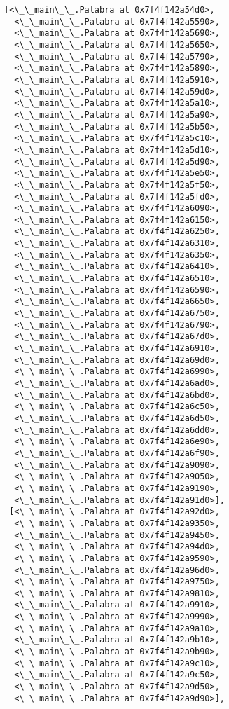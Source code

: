 \documentclass[12pt,a4paper,table]{article}
\begin{document}
\begin{tcolorbox}[breakable, size=fbox, boxrule=.5pt, pad at break*=1mm, opacityfill=0]
\begin{Verbatim}[commandchars=\\\{\}]
 [<\_\_main\_\_.Palabra at 0x7f4f142a54d0>,
  <\_\_main\_\_.Palabra at 0x7f4f142a5590>,
  <\_\_main\_\_.Palabra at 0x7f4f142a5690>,
  <\_\_main\_\_.Palabra at 0x7f4f142a5650>,
  <\_\_main\_\_.Palabra at 0x7f4f142a5790>,
  <\_\_main\_\_.Palabra at 0x7f4f142a5890>,
  <\_\_main\_\_.Palabra at 0x7f4f142a5910>,
  <\_\_main\_\_.Palabra at 0x7f4f142a59d0>,
  <\_\_main\_\_.Palabra at 0x7f4f142a5a10>,
  <\_\_main\_\_.Palabra at 0x7f4f142a5a90>,
  <\_\_main\_\_.Palabra at 0x7f4f142a5b50>,
  <\_\_main\_\_.Palabra at 0x7f4f142a5c10>,
  <\_\_main\_\_.Palabra at 0x7f4f142a5d10>,
  <\_\_main\_\_.Palabra at 0x7f4f142a5d90>,
  <\_\_main\_\_.Palabra at 0x7f4f142a5e50>,
  <\_\_main\_\_.Palabra at 0x7f4f142a5f50>,
  <\_\_main\_\_.Palabra at 0x7f4f142a5fd0>,
  <\_\_main\_\_.Palabra at 0x7f4f142a6090>,
  <\_\_main\_\_.Palabra at 0x7f4f142a6150>,
  <\_\_main\_\_.Palabra at 0x7f4f142a6250>,
  <\_\_main\_\_.Palabra at 0x7f4f142a6310>,
  <\_\_main\_\_.Palabra at 0x7f4f142a6350>,
  <\_\_main\_\_.Palabra at 0x7f4f142a6410>,
  <\_\_main\_\_.Palabra at 0x7f4f142a6510>,
  <\_\_main\_\_.Palabra at 0x7f4f142a6590>,
  <\_\_main\_\_.Palabra at 0x7f4f142a6650>,
  <\_\_main\_\_.Palabra at 0x7f4f142a6750>,
  <\_\_main\_\_.Palabra at 0x7f4f142a6790>,
  <\_\_main\_\_.Palabra at 0x7f4f142a67d0>,
  <\_\_main\_\_.Palabra at 0x7f4f142a6910>,
  <\_\_main\_\_.Palabra at 0x7f4f142a69d0>,
  <\_\_main\_\_.Palabra at 0x7f4f142a6990>,
  <\_\_main\_\_.Palabra at 0x7f4f142a6ad0>,
  <\_\_main\_\_.Palabra at 0x7f4f142a6bd0>,
  <\_\_main\_\_.Palabra at 0x7f4f142a6c50>,
  <\_\_main\_\_.Palabra at 0x7f4f142a6d50>,
  <\_\_main\_\_.Palabra at 0x7f4f142a6dd0>,
  <\_\_main\_\_.Palabra at 0x7f4f142a6e90>,
  <\_\_main\_\_.Palabra at 0x7f4f142a6f90>,
  <\_\_main\_\_.Palabra at 0x7f4f142a9090>,
  <\_\_main\_\_.Palabra at 0x7f4f142a9050>,
  <\_\_main\_\_.Palabra at 0x7f4f142a9190>,
  <\_\_main\_\_.Palabra at 0x7f4f142a91d0>],
 [<\_\_main\_\_.Palabra at 0x7f4f142a92d0>,
  <\_\_main\_\_.Palabra at 0x7f4f142a9350>,
  <\_\_main\_\_.Palabra at 0x7f4f142a9450>,
  <\_\_main\_\_.Palabra at 0x7f4f142a94d0>,
  <\_\_main\_\_.Palabra at 0x7f4f142a9590>,
  <\_\_main\_\_.Palabra at 0x7f4f142a96d0>,
  <\_\_main\_\_.Palabra at 0x7f4f142a9750>,
  <\_\_main\_\_.Palabra at 0x7f4f142a9810>,
  <\_\_main\_\_.Palabra at 0x7f4f142a9910>,
  <\_\_main\_\_.Palabra at 0x7f4f142a9990>,
  <\_\_main\_\_.Palabra at 0x7f4f142a9a10>,
  <\_\_main\_\_.Palabra at 0x7f4f142a9b10>,
  <\_\_main\_\_.Palabra at 0x7f4f142a9b90>,
  <\_\_main\_\_.Palabra at 0x7f4f142a9c10>,
  <\_\_main\_\_.Palabra at 0x7f4f142a9c50>,
  <\_\_main\_\_.Palabra at 0x7f4f142a9d50>,
  <\_\_main\_\_.Palabra at 0x7f4f142a9d90>],

\end{Verbatim}
\end{tcolorbox}
\end{document}
